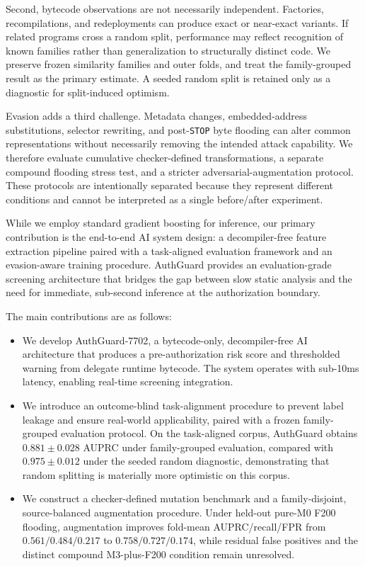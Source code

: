 \documentclass[conference]{IEEEtran}
\begin{document}
Second, bytecode observations are not necessarily independent. Factories, recompilations, and redeployments can produce exact or near-exact variants. If related programs cross a random split, performance may reflect recognition of known families rather than generalization to structurally distinct code. We preserve frozen similarity families and outer folds, and treat the family-grouped result as the primary estimate. A seeded random split is retained only as a diagnostic for split-induced optimism.

Evasion adds a third challenge. Metadata changes, embedded-address substitutions, selector rewriting, and post-\texttt{STOP} byte flooding can alter common representations without necessarily removing the intended attack capability. We therefore evaluate cumulative checker-defined transformations, a separate compound flooding stress test, and a stricter adversarial-augmentation protocol. These protocols are intentionally separated because they represent different conditions and cannot be interpreted as a single before/after experiment.

While we employ standard gradient boosting for inference, our primary contribution is the end-to-end AI system design: a decompiler-free feature extraction pipeline paired with a task-aligned evaluation framework and an evasion-aware training procedure. AuthGuard provides an evaluation-grade screening architecture that bridges the gap between slow static analysis and the need for immediate, sub-second inference at the authorization boundary.

The main contributions are as follows:
\begin{itemize}
  \item We develop AuthGuard-7702, a bytecode-only, decompiler-free AI architecture that produces a pre-authorization risk score and thresholded warning from delegate runtime bytecode. The system operates with sub-10ms latency, enabling real-time screening integration.
  \item We introduce an outcome-blind task-alignment procedure to prevent label leakage and ensure real-world applicability, paired with a frozen family-grouped evaluation protocol. On the task-aligned corpus, AuthGuard obtains $0.881\pm0.028$ AUPRC under family-grouped evaluation, compared with $0.975\pm0.012$ under the seeded random diagnostic, demonstrating that random splitting is materially more optimistic on this corpus.
  \item We construct a checker-defined mutation benchmark and a family-disjoint, source-balanced augmentation procedure. Under held-out pure-M0 F200 flooding, augmentation improves fold-mean AUPRC/recall/FPR from $0.561/0.484/0.217$ to $0.758/0.727/0.174$, while residual false positives and the distinct compound M3-plus-F200 condition remain unresolved.
\end{itemize}
\end{document}
